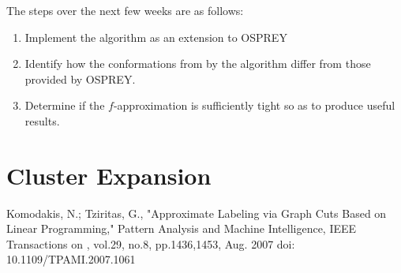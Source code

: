 \documentclass[11pt]{article}
\begin{document}
	The steps over the next few weeks are as follows:
	\begin{enumerate}
		\item Implement the algorithm as an extension to OSPREY

		\item Identify how the conformations from by the algorithm differ from 
		those provided by OSPREY. 
		
		\item Determine if the $f$-approximation is sufficiently tight so as to
		produce useful results. 
	\end{enumerate} 
	
	\section{Cluster Expansion}
	
	
	\begin{thebibliography}{99}
		 Komodakis, N.; Tziritas, G., "Approximate Labeling
		via Graph Cuts Based on Linear Programming," Pattern Analysis and Machine Intelligence, IEEE Transactions on , vol.29, no.8, pp.1436,1453, Aug. 2007
		doi: 10.1109/TPAMI.2007.1061		
	\end{thebibliography}
\end{document}
